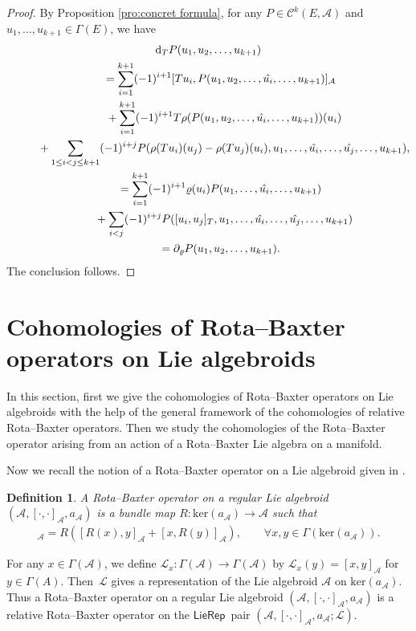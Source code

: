 \documentclass[10pt,a4paper]{amsart}
\numberwithin{equation}{section}
\newtheorem{defi}[thm]{Definition}
\newcommand{\huaA}{\mathcal{A}}
\newcommand{\huaC}{\mathcal{C}}
\newcommand{\huaL}{\mathcal{L}}
\newcommand{\dM}{\mathrm{d}}
\newcommand{\Ker}{\mathrm{ker}}
\newcommand{\LP}{$\mathsf{LieRep}$~}
\begin{document}
\begin{proof}
By Proposition \ref{pro:concret formula}, for any $P\in\huaC^k(E,\huaA)$ and $u_1,\dots,u_{k+1}\in\Gamma{(E)}$, we have
\begin{gather*}
\dM_{T}P(u_1,u_2,\dots,u_{k+1})
\\ \qquad
{}=\sum_{i=1}^{k+1}(-1)^{i+1}[Tu_i,P(u_1,u_2,\dots,\hat{u_i},\dots,u_{k+1})]_{\huaA}
\\ \qquad\hphantom{=}
{}+\sum_{i=1}^{k+1}(-1)^{i+1}T\rho(P(u_1,u_2,\dots,\hat{u_i},\dots,u_{k+1}))(u_i)
\\ \qquad\hphantom{=}
{}+\sum_{1\leq i<j\leq {k+1}}(-1)^{i+j}P(\rho(Tu_i)(u_j)-\rho(Tu_j)(u_i),u_1,\dots,\hat{u_i},\dots,\hat{u_j},\dots,u_{k+1}),
\\ \qquad
{}=\sum_{i=1}^{k+1}(-1)^{i+1}\varrho(u_i)P(u_1,\dots,\hat{u_i},\dots,u_{k+1})
\\ \qquad\hphantom{=}
{}+\sum_{i<j}(-1)^{i+j}P([u_i,u_j]_T,u_1,\dots,\hat{u_i},\dots,\hat{u_j},\dots,u_{k+1})
\\ \qquad
{}=\partial_{\varrho}P(u_1,u_2,\dots,u_{k+1}).
\end{gather*}
The conclusion follows.
\end{proof}


\section{Cohomologies of Rota--Baxter operators on Lie algebroids}\label{sce:Cohomology RB}
In this section, first we give the cohomologies of Rota--Baxter operators on Lie algebroids with the help of the general framework of the cohomologies of relative Rota--Baxter operators. Then we study the cohomologies of the Rota--Baxter operator arising from an action of a Rota--Baxter Lie algebra on a manifold.

 Now we recall the notion of a Rota--Baxter operator on a Lie algebroid given in \cite{Rota--Baxter_Lie_algebroid}.
\begin{defi}
 A {\it Rota--Baxter operator} on a regular Lie algebroid $(\huaA,[\cdot,\cdot]_\huaA,a_\huaA)$ is a bundle map $R\colon \Ker(a_\huaA)\to \huaA$ such that
 \begin{gather*}%
 [R(x),R(y)]_\huaA=R([R(x),y]_\huaA+[x,R(y)]_\huaA),\qquad \forall x,y\in\Gamma(\Ker(a_\huaA)).
 \end{gather*}
\end{defi}

For any $x\in\Gamma(\huaA)$, we define $\huaL_x\colon \Gamma(\huaA)\longrightarrow\Gamma(\huaA)$ by $\huaL_x(y)=[x,y]_\huaA$ for $y\in\Gamma(A)$. Then~$\huaL$ gives a representation of the Lie algebroid $\huaA$ on $ \Ker(a_\huaA)$. Thus a Rota--Baxter operator on a regular Lie algebroid $(\huaA,[\cdot,\cdot]_\huaA,a_\huaA)$ is a relative Rota--Baxter operator on the \LP pair $(\huaA,[\cdot,\cdot]_\huaA,a_\huaA;\huaL)$.
\end{document}
